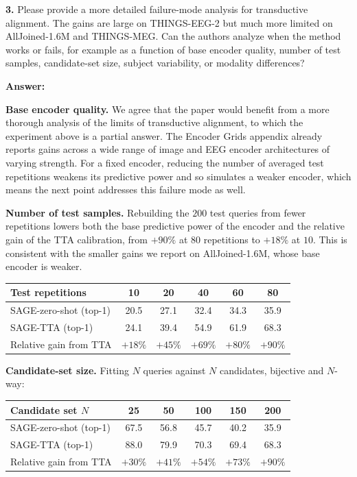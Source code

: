 \documentclass[11pt]{article}
\newcommand{\answer}[1]{{\textbf{Answer:} \color{blue} #1}}
\begin{document}
\textbf{3.} Please provide a more detailed failure-mode analysis for transductive alignment. The gains
are large on THINGS-EEG-2 but much more limited on AllJoined-1.6M and THINGS-MEG. Can the authors
analyze when the method works or fails, for example as a function of base encoder quality, number of
test samples, candidate-set size, subject variability, or modality differences?

\answer{

\textbf{Base encoder quality.} We agree that the paper would benefit from a more thorough analysis of the limits of transductive alignment, to which the experiment above is a partial answer. The Encoder Grids appendix already reports gains across a wide range of image and EEG encoder architectures of varying strength. For a fixed encoder, reducing the number of averaged test repetitions weakens its predictive power and so simulates a weaker encoder, which means the next point addresses this failure mode as well.

\textbf{Number of test samples.} Rebuilding the $200$ test queries from fewer repetitions lowers both
the base predictive power of the encoder and the relative gain of the TTA calibration, from $+90\%$ at
$80$ repetitions to $+18\%$ at $10$. This is consistent with the smaller gains we report on
AllJoined-1.6M, whose base encoder is weaker.

\begin{center}
\begin{tabular}{lccccc}
\hline
Test repetitions & 10 & 20 & 40 & 60 & 80 \\
\hline
SAGE-zero-shot (top-1) & 20.5 & 27.1 & 32.4 & 34.3 & 35.9 \\
SAGE-TTA (top-1)       & 24.1 & 39.4 & 54.9 & 61.9 & 68.3 \\
Relative gain from TTA & $+18\%$ & $+45\%$ & $+69\%$ & $+80\%$ & $+90\%$ \\
\hline
\end{tabular}
\end{center}

\textbf{Candidate-set size.} Fitting $N$ queries against $N$ candidates, bijective and $N$-way:

\begin{center}
\begin{tabular}{lccccc}
\hline
Candidate set $N$ & 25 & 50 & 100 & 150 & 200 \\
\hline
SAGE-zero-shot (top-1) & 67.5 & 56.8 & 45.7 & 40.2 & 35.9 \\
SAGE-TTA (top-1)       & 88.0 & 79.9 & 70.3 & 69.4 & 68.3 \\
Relative gain from TTA & $+30\%$ & $+41\%$ & $+54\%$ & $+73\%$ & $+90\%$ \\
\hline
\end{tabular}
\end{center}

}
\end{document}

